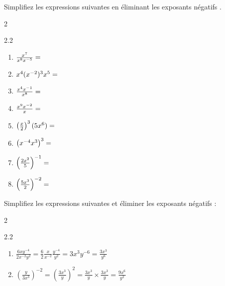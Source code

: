 \documentclass[main.tex]{subfiles}
\begin{document}
\begin{exercise}[\cancel{\faCalculator}] Simplifiez les expressions suivantes en éliminant les exposants négatifs .\hfill \vspace{-1.0em}
	\begin{multicols}{2}
		\begin{spacing}{2.2}	
			\begin{enumerate}[label={}, leftmargin=*]
				\item $\frac{x^7}{x^8  x^{-5}}=\dotfill$ 
				\item $x^4  (x^{-2})^3   x^5=\dotfill$  
				\item $\frac{x^4   x^{-1}}{x^8}=\dotfill$   
				\item $\frac{x^9x^{-2}}{x}=\dotfill$
				\item $\left(\frac{x}{2}\right)^3(5x^6)=\dotfill$
				\item $\big(x^{-4}x^3\big)^3=\dotfill$
				\item $\left(\frac{2x^2}{5}\right)^{-1}=\dotfill$
				\item $\left(\frac{5x^3}{2}\right)^{-2}=\dotfill$
		\end{enumerate}
	\end{spacing}\vspace{-0.5em}
\end{multicols} 
\end{exercise} 
\begin{example}  Simplifiez les expressions suivantes  et éliminer les exposants négatifs :\hfill \vspace{-0.5em} 
	\begin{multicols}{2}
		\begin{spacing}{2.2} 
			\begin{enumerate}[label={},leftmargin=*]
				\item $\frac{6xy^{-4}}{2x^{-2}y^2}=\frac{6}{2}\frac{x}{x^{-2}}\frac{y^{-4}}{y^2}=3x^{3}y^{-6}=\frac{3x^3}{y^6}$
				\item $\left(\frac{y}{3x^3}\right)^{-2}=\left(\frac{3x^3}{y}\right)^{2}=\frac{3x^3}{y}\times \frac{ 3x^3}{y}=\frac{9x^6}{y^2}$
			\end{enumerate}
		\end{spacing}	 \vspace{-1em} 
	\end{multicols} 
\end{example}
\end{document}
